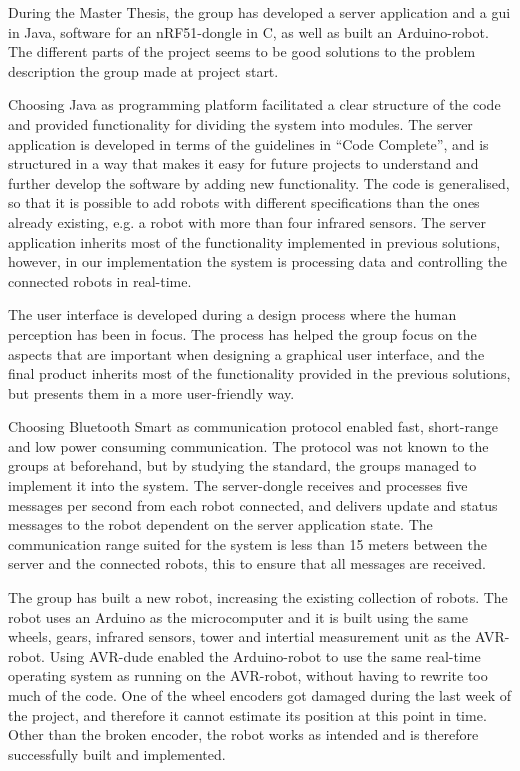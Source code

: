 During the Master Thesis, the group has developed a server application and a \acrlong{gui} in Java, software for an nRF51-dongle in C, as well as built an Arduino-robot. The different parts of the project seems to be good solutions to the problem description the group made at project start.

Choosing Java as programming platform facilitated a clear structure of the code and provided functionality for dividing the system into modules. The server application is developed in terms of the guidelines in ``Code Complete'', and is structured in a way that makes it easy for future projects to understand and further develop the software by adding new functionality. The code is generalised, so that it is possible to add robots with different specifications than the ones already existing, e.g. a robot with more than four infrared sensors. The server application inherits most of the functionality implemented in previous solutions, however, in our implementation the system is processing data and controlling the connected robots in real-time.

The user interface is developed during a design process where the human perception has been in focus. The process has helped the group focus on the aspects that are important when designing a graphical user interface, and the final product inherits most of the functionality provided in the previous solutions, but presents them in a more user-friendly way.

Choosing Bluetooth Smart as communication protocol enabled fast, short-range and low power consuming communication. The protocol was not known to the groups at beforehand, but by studying the standard, the groups managed to implement it into the system. The server-dongle receives and processes five messages per second from each robot connected, and delivers update and status messages to the robot dependent on the server application state. The communication range suited for the system is less than 15 meters between the server and the connected robots, this to ensure that all messages are received.

The group has built a new robot, increasing the existing collection of robots. The robot uses an Arduino as the microcomputer and it is built using the same wheels, gears, infrared sensors, tower and intertial measurement unit as the AVR-robot. Using AVR-dude enabled the Arduino-robot to use the same real-time operating system as running on the AVR-robot, without having to rewrite too much of the code. One of the wheel encoders got damaged during the last week of the project, and therefore it cannot estimate its position at this point in time. Other than the broken encoder, the robot works as intended and is therefore successfully built and implemented.

